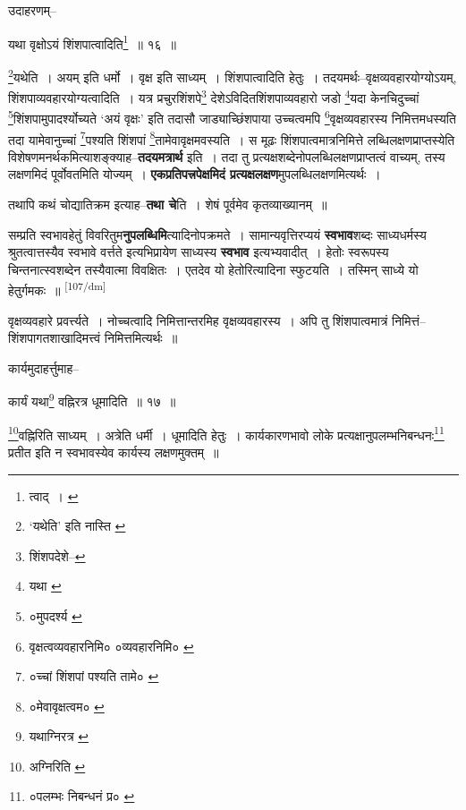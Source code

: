 \documentclass[article,12pt,a4paper]{memoir}
\begin{document}
	उदाहरणम्-- 
	  
	यथा वृक्षोऽयं शिंशपात्वादिति\footnote{त्वाद् । \cite{dp-msC}} ॥ १६ ॥ 
	  
	\footnote{‘यथेति’ इति नास्ति \cite{dp-edH} \cite{dp-edE} \cite{dp-edN}}यथेति । अयम् इति धर्मो । वृक्ष इति साध्यम् । शिंशपात्वादिति हेतुः । तदयमर्थः--वृक्षव्यवहारयोग्योऽयम्, शिंशपाव्यवहारयोग्यत्वादिति । यत्र प्रचुरशिंशपे\footnote{शिंशपदेशे--\cite{dp-msC}} देशेऽविदितशिंशपाव्यवहारो जडो \footnote{यथा \cite{dp-msB}}यदा केनचिदुच्चां \footnote{०मुपदर्श्य \cite{dp-msB}}शिंशपामुपादर्श्योच्यते ‘अयं वृक्षः’ इति तदासौ जाड्याच्छिंशपाया उच्चत्वमपि \footnote{वृक्षत्वव्यवहारनिमि० \cite{dp-msC} ०व्यवहारनिमि० \cite{dp-msA} \cite{dp-edP} \cite{dp-edE} \cite{dp-edH} \cite{dp-edN}}वृक्षव्यवहारस्य निमित्तमधस्यति तदा यामेवानुच्चां \footnote{०च्चां शिंशपां पश्यति तामे० \cite{dp-msA} \cite{dp-edP} \cite{dp-edH} \cite{dp-edE} \cite{dp-edN}}पश्यति शिंशपां \footnote{०मेवावृक्षत्वम० \cite{dp-msA}}तामेवावृक्षमवस्यति । स मूढः शिंशपात्वमात्रनिमित्ते लब्धिलक्षणप्राप्तस्येति विशेषणमनर्थकमित्याशङ्क्याह--\textbf{तदयमत्रार्थ} इति । तदा तु प्रत्यक्षशब्देनोपलब्धिलक्षणप्राप्तत्वं वाच्यम्, तस्य लक्षणमिदं पूर्वोवतमिति योज्यम् । \textbf{एकप्रतिपत्त्रपेक्षमिदं प्रत्यक्षलक्षण}मुपलब्धिलक्षणमित्यर्थः ।
	\pend
      

	  \pstart तथापि कथं चोद्यातिक्रम इत्याह--\textbf{तथा चे}ति । शेषं पूर्वमेव कृतव्याख्यानम् ॥
	\pend
      

	  \pstart सम्प्रति स्वभावहेतुं विवरितुम\textbf{नुपलब्धिमि}त्यादिनोपक्रमते । सामान्यवृत्तिरप्ययं \textbf{स्वभाव}शब्दः साध्यधर्मस्य श्रुतत्वात्तस्यैव स्वभावे वर्त्तते इत्यभिप्रायेण साध्यस्य \textbf{स्वभाव} इत्यभ्यवादीत् । हेतोः स्वरूपस्य चिन्तनात्स्वशब्देन तस्यैवात्मा विवक्षितः । एतदेव यो हेतोरित्यादिना स्फुटयति । तस्मिन् साध्ये यो हेतुर्गमकः ॥
	\pend
      \leavevmode\textsuperscript{\rmlatinfont\tiny [107/dm]}

	  \pstart वृक्षव्यवहारे प्रवर्त्त्यते । नोच्चत्वादि निमित्तान्तरमिह वृक्षव्यवहारस्य । अपि तु शिंशपात्वमात्रं निमित्तं--शिंशपागतशाखादिमत्त्वं निमित्तमित्यर्थः ॥
	\pend
       

	  \pstart कार्यमुदाहर्त्तुमाह--
	\pend
       

	  \pstart कार्यं यथा\footnote{यथाग्निरत्र \cite{dp-msB} \cite{dp-msD} \cite{dp-edP} \cite{dp-edH} \cite{dp-edE} \cite{dp-edN}} वह्निरत्र धूमादिति ॥ १७ ॥
	\pend
       

	  \pstart \footnote{अग्निरिति \cite{dp-msB} \cite{dp-msD} \cite{dp-edP} \cite{dp-edH} \cite{dp-edE} \cite{dp-edN}}वह्निरिति साध्यम् । अत्रेति धर्मी । धूमादिति हेतुः । कार्यकारणभावो लोके प्रत्यक्षानुपलम्भनिबन्धनः\footnote{०पलम्भः निबन्धनं प्र० \cite{dp-msB}} प्रतीत इति न स्वभावस्येव कार्यस्य लक्षणमुक्तम् ॥
	\pend
      
\end{document}
